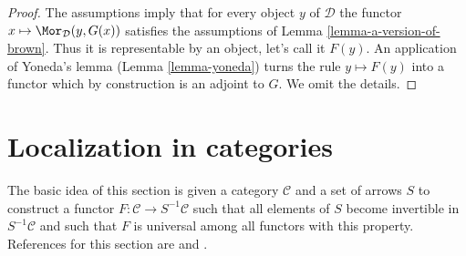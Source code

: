 \begin{proof}
The assumptions imply that for every object $y$ of $\mathcal{D}$
the functor $x \mapsto \Mor_\mathcal{D}(y, G(x))$ satisfies the
assumptions of Lemma \ref{lemma-a-version-of-brown}.
Thus it is representable by an object, let's call it $F(y)$.
An application of Yoneda's lemma (Lemma \ref{lemma-yoneda})
turns the rule $y \mapsto F(y)$ into a functor which
by construction is an adjoint to $G$. We omit the details.
\end{proof}





\section{Localization in categories}
\label{section-localization}

\noindent
The basic idea of this section is given a category $\mathcal{C}$
and a set of arrows $S$ to construct a functor
$F : \mathcal{C} \to S^{-1}\mathcal{C}$
such that all elements of $S$ become invertible in $S^{-1}\mathcal{C}$
and such that $F$ is universal among all functors with this property.
References for this section are \cite[Chapter I, Section 2]{GZ}
and \cite[Chapter II, Section 2]{Verdier}.

